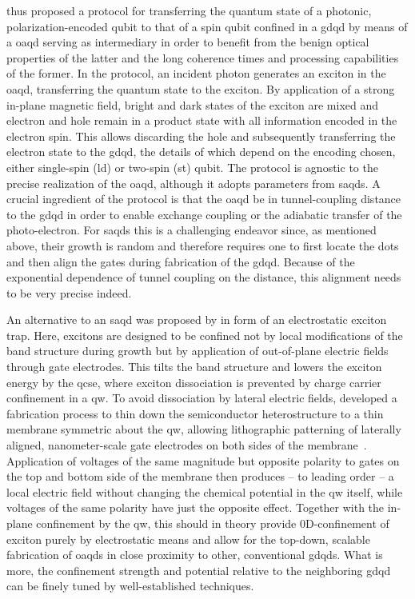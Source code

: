 \citet{Jocker2019} thus proposed a protocol for transferring the quantum state of a photonic, polarization-encoded qubit to that of a spin qubit confined in a \gls{gdqd} by means of a \gls{oaqd} serving as intermediary in order to benefit from the benign optical properties of the latter and the long coherence times and processing capabilities of the former.
In the protocol, an incident photon generates an exciton in the \gls{oaqd}, transferring the quantum state to the exciton.
By application of a strong in-plane magnetic field, bright and dark states of the exciton are mixed and electron and hole remain in a product state with all information encoded in the electron spin.
This allows discarding the hole and subsequently transferring the electron state to the \gls{gdqd}, the details of which depend on the encoding chosen, either single-spin (\gls{ld}) or two-spin (\gls{st}) qubit.
The protocol is agnostic to the precise realization of the \gls{oaqd}, although it adopts parameters from \glspl{saqd}.
A crucial ingredient of the protocol is that the \gls{oaqd} be in tunnel-coupling distance to the \gls{gdqd} in order to enable exchange coupling or the adiabatic transfer of the photo-electron.
For \glspl{saqd} this is a challenging endeavor since, as mentioned above, their growth is random and therefore requires one to first locate the dots and then align the gates during fabrication of the \gls{gdqd}.
Because of the exponential dependence of tunnel coupling on the distance, this alignment needs to be very precise indeed.

An alternative to an \gls{saqd} was proposed by \citet{Descamps2021} in form of an electrostatic exciton trap.
Here, excitons are designed to be confined not by local modifications of the band structure during growth but by application of out-of-plane electric fields through gate electrodes.
This tilts the band structure and lowers the exciton energy by the \gls{qcse}, where exciton dissociation is prevented by charge carrier confinement in a \gls{qw}.
To avoid dissociation by lateral electric fields, \citet{Descamps2021} developed a fabrication process to thin down the semiconductor heterostructure to a thin membrane symmetric about the \gls{qw}, allowing lithographic patterning of laterally aligned, nanometer-scale gate electrodes on both sides of the membrane~\cite{Descamps2023}.
Application of voltages of the same magnitude but opposite polarity to gates on the top and bottom side of the membrane then produces -- to leading order -- a local electric field without changing the chemical potential in the \gls{qw} itself, while voltages of the same polarity have just the opposite effect.
Together with the in-plane confinement by the \gls{qw}, this should in theory provide 0D-confinement of exciton purely by electrostatic means and allow for the top-down, scalable fabrication of \glspl{oaqd} in close proximity to other, conventional \glspl{gdqd}.
What is more, the confinement strength and potential relative to the neighboring \gls{gdqd} can be finely tuned by well-established techniques.

